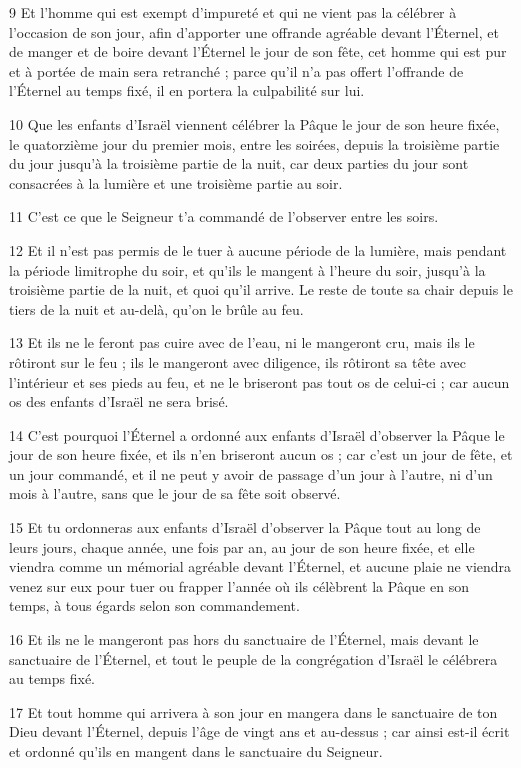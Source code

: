 \par 9 Et l'homme qui est exempt d'impureté et qui ne vient pas la célébrer à l'occasion de son jour, afin d'apporter une offrande agréable devant l'Éternel, et de manger et de boire devant l'Éternel le jour de son fête, cet homme qui est pur et à portée de main sera retranché ; parce qu'il n'a pas offert l'offrande de l'Éternel au temps fixé, il en portera la culpabilité sur lui.
\par 10 Que les enfants d'Israël viennent célébrer la Pâque le jour de son heure fixée, le quatorzième jour du premier mois, entre les soirées, depuis la troisième partie du jour jusqu'à la troisième partie de la nuit, car deux parties du jour sont consacrées à la lumière et une troisième partie au soir.
\par 11 C'est ce que le Seigneur t'a commandé de l'observer entre les soirs.
\par 12 Et il n'est pas permis de le tuer à aucune période de la lumière, mais pendant la période limitrophe du soir, et qu'ils le mangent à l'heure du soir, jusqu'à la troisième partie de la nuit, et quoi qu'il arrive. Le reste de toute sa chair depuis le tiers de la nuit et au-delà, qu'on le brûle au feu.
\par 13 Et ils ne le feront pas cuire avec de l'eau, ni le mangeront cru, mais ils le rôtiront sur le feu ; ils le mangeront avec diligence, ils rôtiront sa tête avec l'intérieur et ses pieds au feu, et ne le briseront pas tout os de celui-ci ; car aucun os des enfants d’Israël ne sera brisé.
\par 14 C'est pourquoi l'Éternel a ordonné aux enfants d'Israël d'observer la Pâque le jour de son heure fixée, et ils n'en briseront aucun os ; car c'est un jour de fête, et un jour commandé, et il ne peut y avoir de passage d'un jour à l'autre, ni d'un mois à l'autre, sans que le jour de sa fête soit observé.
\par 15 Et tu ordonneras aux enfants d'Israël d'observer la Pâque tout au long de leurs jours, chaque année, une fois par an, au jour de son heure fixée, et elle viendra comme un mémorial agréable devant l'Éternel, et aucune plaie ne viendra venez sur eux pour tuer ou frapper l'année où ils célèbrent la Pâque en son temps, à tous égards selon son commandement.
\par 16 Et ils ne le mangeront pas hors du sanctuaire de l'Éternel, mais devant le sanctuaire de l'Éternel, et tout le peuple de la congrégation d'Israël le célébrera au temps fixé.
\par 17 Et tout homme qui arrivera à son jour en mangera dans le sanctuaire de ton Dieu devant l'Éternel, depuis l'âge de vingt ans et au-dessus ; car ainsi est-il écrit et ordonné qu'ils en mangent dans le sanctuaire du Seigneur.
